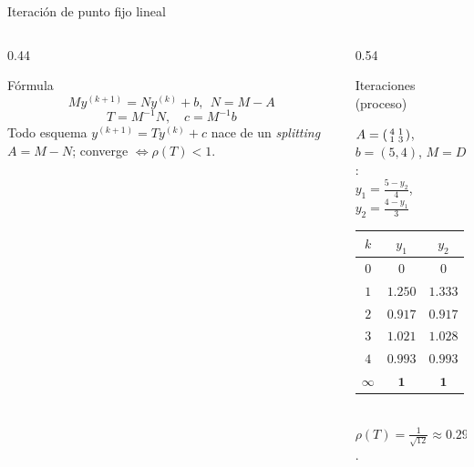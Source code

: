 \documentclass[aspectratio=169,10pt]{beamer}
\begin{document}
\begin{frame}{Iteración de punto fijo lineal}
\begin{columns}[T]
\begin{column}{0.44\textwidth}
\begin{cardidea}{Fórmula}{\faSuperscript}
$$My^{(k+1)}=Ny^{(k)}+b,\ \ N=M-A$$
$$T=M^{-1}N,\quad c=M^{-1}b$$
{\footnotesize Todo esquema $y^{(k+1)}=Ty^{(k)}+c$ nace de un \emph{splitting} $A=M-N$; converge $\iff\rho(T)<1$.}
\end{cardidea}
\end{column}
\begin{column}{0.54\textwidth}
\begin{cardgear}{Iteraciones (proceso)}{\faTable}
\centering
{\footnotesize $A=\begin{psmallmatrix}4&1\\1&3\end{psmallmatrix}$, $b=(5,4)$, $M=D$:\\[0.8mm]
$y_1=\tfrac{5-y_2}{4}$,\; $y_2=\tfrac{4-y_1}{3}$\\[1mm]
\renewcommand{\arraystretch}{1.15}
\begin{tabular}{c|cc}
$k$ & $y_1$ & $y_2$\\\hline
$0$&$0$&$0$\\ $1$&$1.250$&$1.333$\\ $2$&$0.917$&$0.917$\\ $3$&$1.021$&$1.028$\\ $4$&$0.993$&$0.993$\\ $\infty$&$\mathbf 1$&$\mathbf 1$\\
\end{tabular}\\[1mm]
$\rho(T)=\tfrac{1}{\sqrt{12}}\approx0.29<1$.}
\end{cardgear}
\end{column}
\end{columns}
\end{frame}
\end{document}
